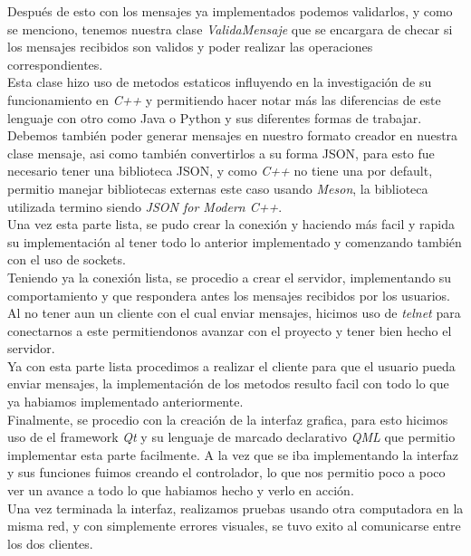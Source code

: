 \documentclass[12pt]{report}
\begin{document}
Después de esto con los mensajes ya implementados podemos validarlos, y como se menciono, tenemos nuestra clase \textit{ValidaMensaje} que se encargara de checar si los mensajes recibidos son validos y poder realizar las operaciones correspondientes.\\

Esta clase hizo uso de metodos estaticos influyendo en la investigación de su funcionamiento en \textit{C++} y permitiendo hacer notar más las diferencias de este lenguaje con otro como Java o Python y sus diferentes formas de trabajar.\\

Debemos también poder generar mensajes en nuestro formato creador en nuestra clase mensaje, asi como también convertirlos a su forma JSON, para esto fue necesario tener una biblioteca JSON, y como \textit{C++} no tiene una por default, permitio manejar bibliotecas externas este caso usando \textit{Meson}, la biblioteca utilizada termino siendo \textit{JSON for Modern C++}.\\

Una vez esta parte lista, se pudo crear la conexión y haciendo más facil y rapida su implementación al tener todo lo anterior implementado y comenzando también con el uso de sockets.\\

Teniendo ya la conexión lista, se procedio a crear el servidor, implementando su comportamiento y que respondera antes los mensajes recibidos por los usuarios. Al no tener aun un cliente con el cual enviar mensajes, hicimos uso de \textit{telnet} para conectarnos a este permitiendonos avanzar con el proyecto y tener bien hecho el servidor.\\

Ya con esta parte lista procedimos a realizar el cliente para que el usuario pueda enviar mensajes, la implementación de los metodos resulto facil con todo lo que ya habiamos implementado anteriormente.\\

Finalmente, se procedio con la creación de la interfaz grafica, para esto hicimos uso de el framework \textit{Qt} y su lenguaje de marcado declarativo \textit{QML} que permitio implementar esta parte facilmente. A la vez que se iba implementando la interfaz y sus funciones fuimos creando el controlador, lo que nos permitio poco a poco ver un avance a todo lo que habiamos hecho y verlo en acción.\\

Una vez terminada la interfaz, realizamos pruebas usando otra computadora en la misma red, y con simplemente errores visuales, se tuvo exito al comunicarse entre los dos clientes.\\
\end{document}
